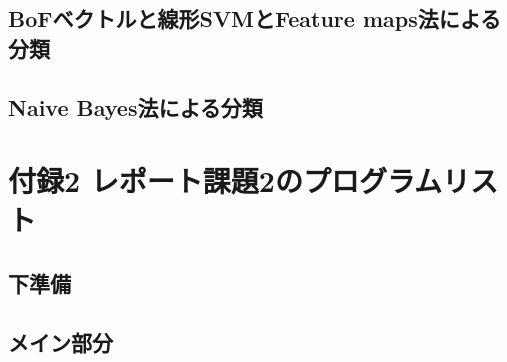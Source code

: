 \documentclass[11pt,a4j]{jreport}
\begin{document}
\subsection{BoFベクトルと線形SVMとFeature maps法による分類}

\subsection{Naive Bayes法による分類}



\section{付録2 レポート課題2のプログラムリスト}
\subsection{下準備}



\subsection{メイン部分}

\end{document}
